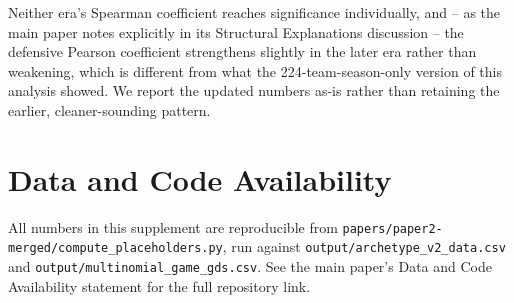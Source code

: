 \documentclass[12pt,a4paper]{article}
\begin{document}
Neither era's Spearman coefficient reaches significance individually, and -- as the main paper
notes explicitly in its Structural Explanations discussion -- the defensive Pearson coefficient
strengthens slightly in the later era rather than weakening, which is different from what the
224-team-season-only version of this analysis showed. We report the updated numbers as-is
rather than retaining the earlier, cleaner-sounding pattern.

\section*{Data and Code Availability}

All numbers in this supplement are reproducible from
\texttt{papers/paper2-merged/compute\_placeholders.py}, run against
\texttt{output/archetype\_v2\_data.csv} and \texttt{output/multinomial\_game\_gds.csv}. See the
main paper's Data and Code Availability statement for the full repository link.

\printbibliography
\end{document}
